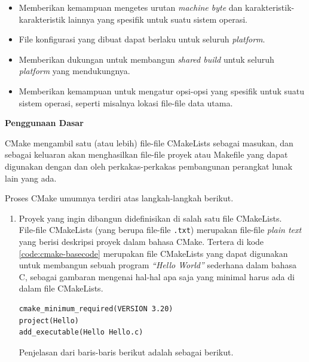 \documentclass[a4paper,twoside]{article}
\begin{document}
\begin{enumerate}
\begin{itemize}
	\item Memberikan kemampuan mengetes urutan \textit{machine byte} dan karakteristik-karakteristik lainnya yang spesifik untuk suatu sistem operasi.
	\item File konfigurasi yang dibuat dapat berlaku untuk seluruh \textit{platform}.
	\item Memberikan dukungan untuk membangun \textit{shared build} untuk seluruh \textit{platform} yang mendukungnya.
	\item Memberikan kemampuan untuk mengatur opsi-opsi yang spesifik untuk suatu sistem operasi, seperti misalnya lokasi file-file data utama.
\end{itemize}

\textbf{Penggunaan Dasar}
\label{sec:cmodules-CMake-basicusage}

CMake mengambil satu (atau lebih) file-file CMakeLists sebagai masukan, dan sebagai keluaran akan menghasilkan file-file proyek atau Makefile yang dapat digunakan dengan dan oleh perkakas-perkakas pembangunan perangkat lunak lain yang ada.

Proses CMake umumnya terdiri atas langkah-langkah berikut.

\begin{enumerate}
	\item Proyek yang ingin dibangun didefinisikan di salah satu file CMakeLists.\\
	File-file CMakeLists (yang berupa file-file \verb|.txt|) merupakan file-file \textit{plain text} yang berisi deskripsi proyek dalam bahasa CMake. Tertera di kode \ref{code:cmake-basecode} merupakan file CMakeLists yang dapat digunakan untuk membangun sebuah program \textit{``Hello World''} sederhana dalam bahasa C, sebagai gambaran mengenai hal-hal apa saja yang minimal harus ada di dalam file CMakeLists.
	
	\begin{lstlisting}[caption=Kode utama operasional CMakeLists, label=code:cmake-basecode]
cmake_minimum_required(VERSION 3.20)
project(Hello)
add_executable(Hello Hello.c)
	\end{lstlisting}
	
	Penjelasan dari baris-baris berikut adalah sebagai berikut.
	

\end{enumerate}
\end{enumerate}
\end{document}
